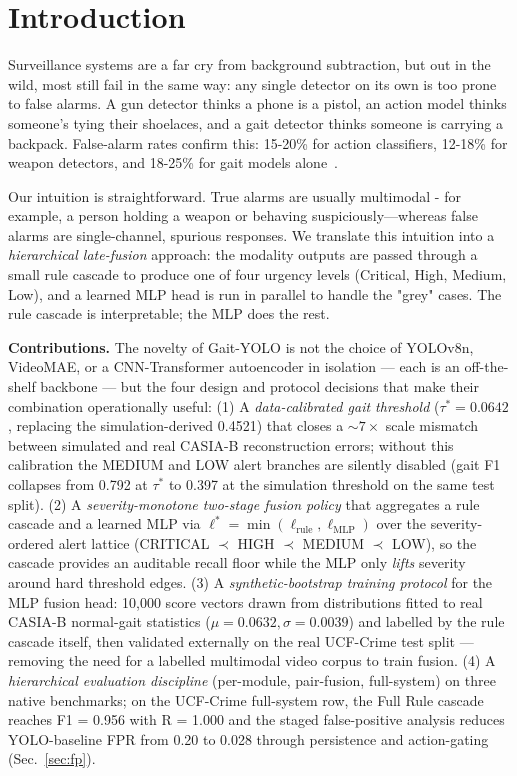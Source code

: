 \documentclass[runningheads]{llncs}
\begin{document}
\section{Introduction}

Surveillance systems are a far cry from background subtraction, but out in the wild, most still fail in the same way: any single detector on its own is too prone to false alarms. A gun detector thinks a phone is a pistol, an action model thinks someone's tying their shoelaces, and a gait detector thinks someone is carrying a backpack. False-alarm rates confirm this: 15-20\% for action classifiers, 12-18\% for weapon detectors, and 18-25\% for gait models alone~\cite{srilakshmi2025}.

Our intuition is straightforward. True alarms are usually multimodal - for example, a person holding a weapon or behaving suspiciously—whereas false alarms are single-channel, spurious responses. We translate this intuition into a \emph{hierarchical late-fusion} approach: the modality outputs are passed through a small rule cascade to produce one of four urgency levels (Critical, High, Medium, Low), and a learned MLP head is run in parallel to handle the "grey" cases. The rule cascade is interpretable; the MLP does the rest.

\textbf{Contributions.} The novelty of Gait-YOLO is not the choice of YOLOv8n, VideoMAE, or a CNN-Transformer autoencoder in isolation --- each is an off-the-shelf backbone --- but the four design and protocol decisions that make their combination operationally useful: (1) A \emph{data-calibrated gait threshold} ($\tau^* = 0.0642$, replacing the simulation-derived 0.4521) that closes a $\sim 7\times$ scale mismatch between simulated and real CASIA-B reconstruction errors; without this calibration the MEDIUM and LOW alert branches are silently disabled (gait F1 collapses from 0.792 at $\tau^*$ to 0.397 at the simulation threshold on the same test split). (2) A \emph{severity-monotone two-stage fusion policy} that aggregates a rule cascade and a learned MLP via $\ell^* = \min(\ell_\text{rule}, \ell_\text{MLP})$ over the severity-ordered alert lattice (CRITICAL $\prec$ HIGH $\prec$ MEDIUM $\prec$ LOW), so the cascade provides an auditable recall floor while the MLP only \emph{lifts} severity around hard threshold edges. (3) A \emph{synthetic-bootstrap training protocol} for the MLP fusion head: 10{,}000 score vectors drawn from distributions fitted to real CASIA-B normal-gait statistics ($\mu=0.0632, \sigma=0.0039$) and labelled by the rule cascade itself, then validated externally on the real UCF-Crime test split --- removing the need for a labelled multimodal video corpus to train fusion. (4) A \emph{hierarchical evaluation discipline} (per-module, pair-fusion, full-system) on three native benchmarks; on the UCF-Crime full-system row, the Full Rule cascade reaches F1 = 0.956 with R = 1.000 and the staged false-positive analysis reduces YOLO-baseline FPR from 0.20 to 0.028 through persistence and action-gating (Sec.~\ref{sec:fp}).
\end{document}

